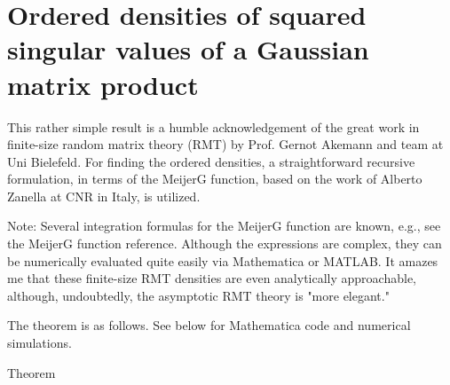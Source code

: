 \section{Ordered densities of squared singular values of a Gaussian matrix product}

\newcommand{\G}[7]{\mathrm{G}^{\tiny\begin{bmatrix}
			#1&#2\\#3&#4
	\end{bmatrix}}\left(\begin{matrix}
		#5 \\ #6
	\end{matrix}\;\middle|\;#7\right)}

This rather simple result is a humble acknowledgement of the great work in finite-size random matrix theory (RMT) by Prof. Gernot Akemann and team at Uni Bielefeld. For finding the ordered densities, a straightforward recursive formulation, in terms of the MeijerG function, based on the work of Alberto Zanella at CNR in Italy, is utilized.

Note: Several integration formulas for the MeijerG function are known, e.g., see the MeijerG function reference.
Although the expressions are complex, they can be numerically evaluated quite easily via Mathematica or MATLAB. It amazes me that these finite-size RMT densities are even analytically approachable, although, undoubtedly, the asymptotic RMT theory is "more elegant."

The theorem is as follows. See below for Mathematica code and numerical simulations.

Theorem

